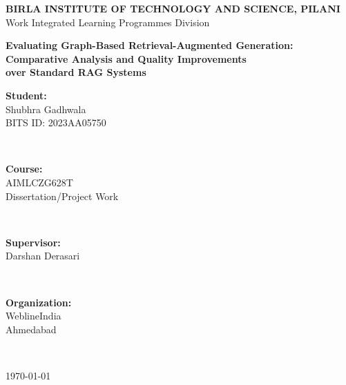 
\begin{titlepage}
\centering
\vspace*{2cm}

{\Large \textbf{BIRLA INSTITUTE OF TECHNOLOGY AND SCIENCE, PILANI}}\\[0.5cm]
{\large Work Integrated Learning Programmes Division}\\[1cm]

\vspace{1cm}

{\Large \textbf{Evaluating Graph-Based Retrieval-Augmented Generation:}}\\[0.3cm]
{\Large \textbf{Comparative Analysis and Quality Improvements}}\\[0.3cm]
{\Large \textbf{over Standard RAG Systems}}\\[2cm]

\vspace{1cm}

\begin{minipage}{0.4\textwidth}
\begin{flushleft}
\textbf{Student:}\\
Shubhra Gadhwala\\
BITS ID: 2023AA05750
\end{flushleft}
\end{minipage}
~
\begin{minipage}{0.4\textwidth}
\begin{flushright}
\textbf{Course:}\\
AIMLCZG628T\\
Dissertation/Project Work
\end{flushright}
\end{minipage}\\[2cm]

\vspace{1cm}

\begin{minipage}{0.4\textwidth}
\begin{flushleft}
\textbf{Supervisor:}\\
Darshan Derasari
\end{flushleft}
\end{minipage}
~
\begin{minipage}{0.4\textwidth}
\begin{flushright}
\textbf{Organization:}\\
WeblineIndia\\
Ahmedabad
\end{flushright}
\end{minipage}\\[3cm]

\vfill

{\large \today}

\end{titlepage}
